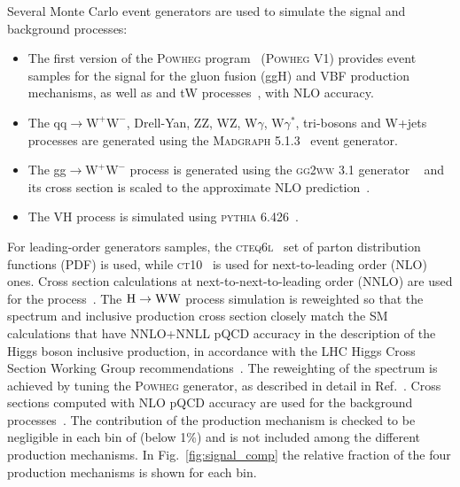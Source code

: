 Several Monte Carlo event generators are used to simulate the signal and background processes:
\begin{itemize}
\item The first version of the \textsc{Powheg} program~\cite{Kramer:2005hw,Frixione:2007vw,Lavesson:2008ah,Alioli:2008tz, Nason:2009ai} (\textsc{Powheg V1}) provides event samples for the \hww signal
for the gluon fusion (ggH) and VBF production mechanisms, as well as \ttbar and tW processes~\cite{Alioli:2011as}, with NLO accuracy.
\item The $\mathrm{qq} \to \mathrm{W^{+}W^{-}}$, Drell-Yan, ZZ, WZ, W$\gamma$, W$\gamma^*$, tri-bosons and W+jets processes are generated using
the \textsc{Madgraph 5.1.3}~\cite{Alwall:2014hca} event generator.
\item The gg$\to \mathrm{W^{+}W^{-}}$ process is generated using the \textsc{gg2ww} 3.1 generator ~\cite{Binoth:2006mf} and its cross section is scaled to the approximate NLO prediction~\cite{Bonvini:2013jha,Passarino:2013bha}.
\item The VH process is simulated using \textsc{pythia 6.426}~\cite{Sjostrand:2006za}.
\end{itemize}
For leading-order generators samples, the \textsc{cteq6l}~\cite{Lai:2010nw} set of parton distribution functions
(PDF) is used, while \textsc{ct10}~\cite{Lai:2010vv} is used for next-to-leading order (NLO) ones.
Cross section calculations at next-to-next-to-leading order (NNLO) are used for the \hww process~\cite{Dittmaier:2011ti}.
The ${\mathrm{H}\to\mathrm{WW}}$ process simulation is reweighted so that the \pth{} spectrum and inclusive production cross section closely match the SM calculations that have NNLO+NNLL pQCD accuracy in the description of the Higgs boson inclusive production, in accordance with the LHC Higgs Cross Section Working Group recommendations~\cite{Heinemeyer:2013tqa}.
The reweighting of the \pth{} spectrum is achieved by tuning the \textsc{Powheg} generator, as described in detail in Ref.~\cite{Alioli:2010xd}.
Cross sections computed with NLO pQCD accuracy are used for the background processes~\cite{Heinemeyer:2013tqa}.
The contribution of the \ttH production mechanism is checked to be negligible in each bin of \pth (below 1\%) and is not included among the different production mechanisms. In Fig.~\ref{fig:signal_comp} the relative fraction of the four production mechanisms is shown for each \pth bin.

